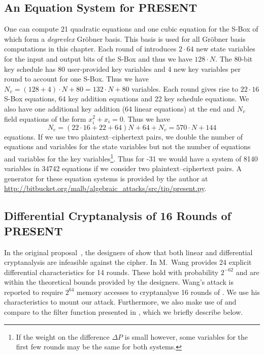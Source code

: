\subsection{An Equation System for PRESENT}
\label{sec:present-equ}
One can compute 21 quadratic equations and one cubic equation for the S-Box of \PRESENT which form a \emph{degrevlex} Gr\"obner basis. This basis is used for all Gröbner basis computations in this chapter. Each round of \PRESENT introduces $2 \cdot 64$ new state variables for the input and output bits of the S-Box and thus we have $128 \cdot N$. The 80-bit key schedule has 80 user-provided key variables and 4 new key variables per round to account for one S-Box. Thus we have $N_v = (128 + 4) \cdot N + 80 = 132 \cdot N + 80$ variables. Each round gives rise to $22 \cdot 16$ S-Box equations, 64 key addition equations and 22 key schedule equations. We also have one additional key addition (64 linear equations) at the end and $N_v$ field equations of the form $x_i^2 + x_i = 0$.
Thus we have $$N_e = (22 \cdot 16 + 22 + 64) N + 64 + N_v = 570 \cdot N + 144$$ equations. If we use two plaintext--ciphertext pairs, we double the number of equations and variables for the state variables but not the number of equations and variables for the key variables\footnote{If the weight on the difference $\Delta P$ is small however, some variables for the first few rounds may be the same for both systems.}. Thus for -31 we would have a system of 8140 variables in 34742 equations if we consider two plaintext--ciphertext pairs. A generator for these equation systems is provided by the author at \url{http://bitbucket.org/malb/algebraic_attacks/src/tip/present.py}.

\subsection{Differential Cryptanalysis of 16 Rounds of PRESENT}
\label{sec:present-dc}

In the original proposal~\cite{present}, the designers of \PRESENT show that both linear and differential cryptanalysis are infeasible against the cipher. In \cite{present-dc:africacrypt,present-differentials} M.~Wang provides 24 explicit differential characteristics for 14 rounds. These hold with probability $2^{-62}$ and are within the theoretical bounds provided by the \PRESENT designers. Wang's attack is reported to require $2^{64}$ memory accesses to cryptanalyse 16 rounds of . We use his characteristics to mount our attack. Furthermore, we also make use of and compare to the filter function presented in \cite{present-dc:africacrypt}, which we briefly describe below.

